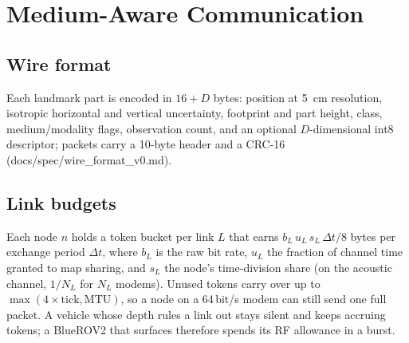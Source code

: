 \section{Medium-Aware Communication}
\label{sec:comm}

\subsection{Wire format}
Each landmark part is encoded in $16 + D$ bytes: position at 5~cm resolution, isotropic horizontal and
vertical uncertainty, footprint and part height, class, medium/modality flags, observation count,
and an optional $D$-dimensional int8 descriptor; packets carry a 10-byte header and a CRC-16
(docs/spec/wire\_format\_v0.md). 

\subsection{Link budgets}
Each node $n$ holds a token bucket per link $L$ that earns $b_L\,u_L\,s_L\,\Delta t/8$ bytes per
exchange period $\Delta t$, where $b_L$ is the raw bit rate, $u_L$ the fraction of channel time
granted to map sharing, and $s_L$ the node's time-division share (on the acoustic channel,
$1/N_L$ for $N_L$ modems). Unused tokens carry over up to $\max(4\times\text{tick}, \mathrm{MTU})$, so a node
on a 64\,bit/s modem can still send one full packet. A vehicle whose depth rules a link
out stays silent and keeps accruing tokens; a BlueROV2 that surfaces therefore spends its RF
allowance in a burst.

